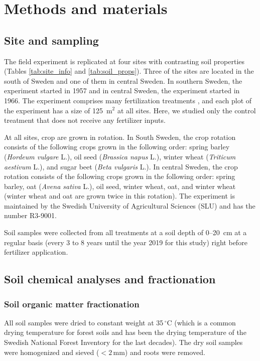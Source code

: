 \documentclass[bg, manuscript]{copernicus}
\begin{document}
\section{Methods and materials}

\subsection{Site and sampling}
The field experiment is replicated at four sites with contrasting soil properties (Tables \ref{tab:site_info} and \ref{tab:soil_props}). Three of the sites are located in the south of Sweden and one of them in central Sweden. In southern Sweden, the experiment started in 1957 and in central Sweden, the experiment started in 1966. The experiment comprises many fertilization treatments \citep{Carlgren2001}, and each plot of the experiment has a size of 125~$\text{m}^2$ at all sites. Here, we studied only the control treatment that does not receive any fertilizer inputs.

At all sites, crop are grown in rotation. In South Sweden, the crop rotation consists of the following crops grown in the following order: spring barley (\textit{Hordeum vulgare} L.), oil seed (\textit{Brassica napus} L.), winter wheat (\textit{Triticum aestivum} L.), and sugar beet (\textit{Beta vulgaris} L.). In central Sweden, the crop rotation consists of the following crops grown in the following order: spring barley, oat (\textit{Avena sativa} L.), oil seed, winter wheat, oat, and winter wheat (winter wheat and oat are grown twice in this rotation). The experiment is maintained by the Swedish University of Agricultural Sciences (SLU) and has the number R3-9001.

Soil samples were collected from all treatments at a soil depth of 0--20~cm at a regular basis (every 3 to 8 years until the year 2019 for this study) right before fertilizer application.

\subsection{Soil chemical analyses and fractionation}

\subsubsection{Soil organic matter fractionation}
All soil samples were dried to constant weight at 35\,$^\circ\text{C}$ (which is a common drying temperature for forest soils and has been the drying temperature of the Swedish National Forest Inventory for the last decades). The dry soil samples were homogenized and sieved ($< 2$\,mm) and roots were removed.
\end{document}
